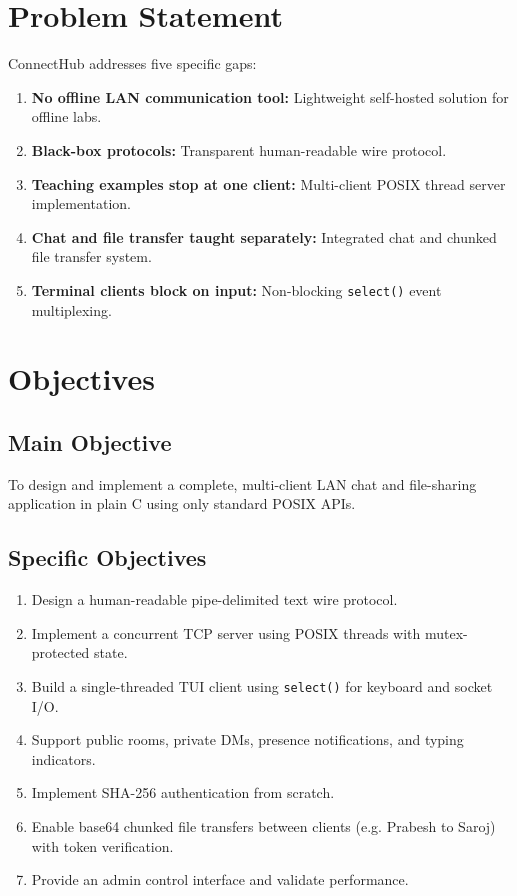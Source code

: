 \documentclass[12pt,a4paper]{report}
\begin{document}
\clearpage
\chapter{Problem Statement}
ConnectHub addresses five specific gaps:
\begin{enumerate}
    \item \textbf{No offline LAN communication tool:} Lightweight self-hosted solution for offline labs.
    \item \textbf{Black-box protocols:} Transparent human-readable wire protocol.
    \item \textbf{Teaching examples stop at one client:} Multi-client POSIX thread server implementation.
    \item \textbf{Chat and file transfer taught separately:} Integrated chat and chunked file transfer system.
    \item \textbf{Terminal clients block on input:} Non-blocking \texttt{select()} event multiplexing.
\end{enumerate}

\clearpage
\chapter{Objectives}
\section{Main Objective}
To design and implement a complete, multi-client LAN chat and file-sharing application in plain C using only standard POSIX APIs.

\section{Specific Objectives}
\begin{enumerate}
    \item Design a human-readable pipe-delimited text wire protocol.
    \item Implement a concurrent TCP server using POSIX threads with mutex-protected state.
    \item Build a single-threaded TUI client using \texttt{select()} for keyboard and socket I/O.
    \item Support public rooms, private DMs, presence notifications, and typing indicators.
    \item Implement SHA-256 authentication from scratch.
    \item Enable base64 chunked file transfers between clients (e.g. Prabesh to Saroj) with token verification.
    \item Provide an admin control interface and validate performance.
\end{enumerate}
\end{document}
